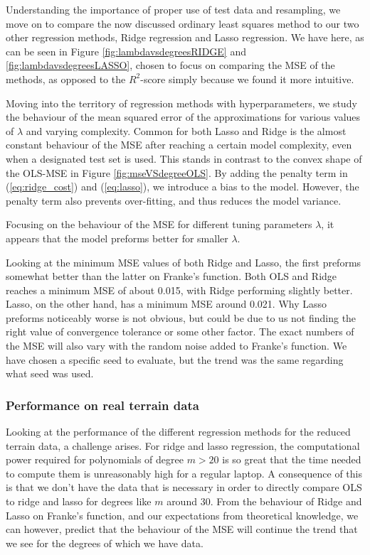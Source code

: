 Understanding the importance of proper use of test data and resampling, we move on to compare the now discussed ordinary least squares method to our two other regression methods, Ridge regression and Lasso regression. We have here, as can be seen in Figure \ref{fig:lambdavsdegreesRIDGE} and \ref{fig:lambdavsdegreesLASSO}, chosen to focus on comparing the MSE of the methods, as opposed to the $R^2$-score simply because we found it more intuitive.

Moving into the territory of regression methods with hyperparameters, we study the behaviour of the mean squared error of the approximations for various values of $\lambda$ and varying complexity.
Common for both Lasso and Ridge is the almost constant behaviour of the MSE after reaching a certain model complexity, even when a designated test set is used. This stands in contrast to the convex shape of the OLS-MSE in Figure \ref{fig:mseVSdegreeOLS}. By adding the penalty term in (\ref{eq:ridge_cost}) and (\ref{eq:lasso}), we introduce a bias to the model. However, the penalty term also prevents over-fitting, and thus reduces the model variance.

Focusing on the behaviour of the MSE for different tuning parameters $\lambda$, it appears that the model preforms better for smaller $\lambda$.

Looking at the minimum MSE values of both Ridge and Lasso, the first preforms somewhat better than the latter on Franke's function. Both OLS and Ridge reaches a minimum MSE of about 0.015, with Ridge performing slightly better. Lasso, on the other hand, has a minimum MSE around 0.021. Why Lasso preforms noticeably worse is not obvious, but could be due to us not finding the right value of convergence tolerance or some other factor. The exact numbers of the MSE will also vary with the random noise added to Franke's function. We have chosen a specific seed to evaluate, but the trend was the same regarding what seed was used.


\subsubsection*{Performance on real terrain data}
Looking at the performance of the different regression methods for the reduced terrain data, a challenge arises. For ridge and lasso regression, the computational power required for polynomials of degree $m > 20$ is so great that the time needed to compute them is unreasonably high for a regular laptop. A consequence of this is that we don't have the data that is necessary in order to directly compare OLS to ridge and lasso for degrees like $m$ around 30. From the behaviour of Ridge and Lasso on Franke's function, and our expectations from theoretical knowledge, we can however, predict that the behaviour of the MSE will continue the trend that we see for the degrees of which we have data.

